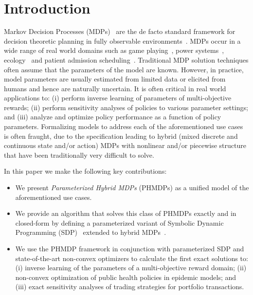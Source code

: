 \section{Introduction}
\label{sec:introduction}

Markov Decision Processes (MDPs)~\cite{Howard_MIT_1960} are the de facto standard framework for decision theoretic planning in fully observable environments~\cite{Boutilier_JAIR_1999}. MDPs occur in a wide range of real world domains such as game playing~\cite{Szita_RL_2012}, power systems~\cite{Reddy_IJCAI_2011}, ecology~\cite{Williams_EM_2009} and patient admission scheduling~\cite{Zhu_AIM_2014}. Traditional MDP solution techniques often assume that the parameters of the model are known. However, in practice, model parameters are usually estimated from limited data or elicited from humans and hence are naturally uncertain. It is often critical in real world applications to: (i) perform inverse learning of parameters of multi-objective rewards; (ii) perform sensitivity analyses of policies to various parameter settings; and (iii) analyze and optimize policy performance as a function of policy parameters.  Formalizing models to address each of the aforementioned use cases is often fraught, due to the specification leading to hybrid (mixed discrete and continuous state and/or action) MDPs with nonlinear and/or piecewise structure that have been traditionally very difficult to solve.

In this paper we make the following key contributions:
\begin{itemize}
\item We present {\it Parameterized Hybrid MDPs} (PHMDPs) as a unified model of the aforementioned use cases.
\item We provide an algorithm that solves this class of PHMDPs exactly and in closed-form by defining a parameterized variant of Symbolic Dynamic Programming (SDP)~\cite{Boutilier_IJCAI_2001} extended to hybrid MDPs~\cite{Sanner_UAI_2011}. 
\item We use the PHMDP framework in conjunction with parameterized SDP and state-of-the-art non-convex optimizers to calculate the first exact solutions to: (i) inverse learning of the parameters of a multi-objective reward domain; (ii) non-convex optimization of public health policies in epidemic models; and (iii) exact sensitivity analyses of trading strategies for portfolio transactions. 
\end{itemize}


